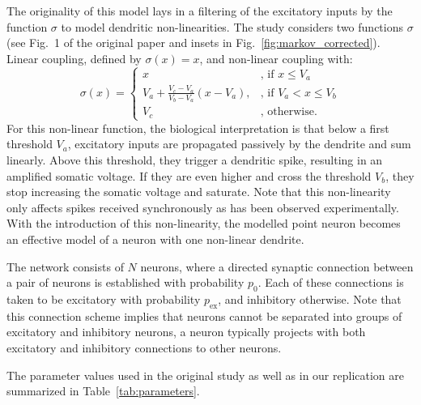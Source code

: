 \documentclass[10pt,a4paper,onecolumn]{article}
\begin{document}
The originality of this model lays in a filtering of the excitatory inputs by the function $\sigma$ to model dendritic non-linearities. The study considers two functions $\sigma$ (see Fig.~1 of the original paper and insets in Fig.~\ref{fig:markov_corrected}). Linear coupling, defined by $\sigma(x)=x$, and non-linear coupling with:
\begin{equation}
    \sigma(x)= 
\begin{cases}
    x              & \text{, if } x\leq V_a\\
    V_a + \frac{V_c-V_a}{V_b-V_a} (x - V_a), & \text{, if } V_a<x \leq V_b\\
    V_c            & \text{, otherwise.}
\end{cases}
\label{eq:non-linear}
\end{equation}
For this non-linear function, the biological interpretation is that below a first threshold $V_a$, excitatory inputs are propagated passively by the dendrite and sum linearly. Above this threshold, they trigger a dendritic spike, resulting in an amplified somatic voltage. If they are even higher and cross the threshold $V_b$, they stop increasing the somatic voltage and saturate. Note that this non-linearity only affects spikes received synchronously as has been observed experimentally. With the introduction of this non-linearity, the modelled point neuron becomes an effective model of a neuron with one non-linear dendrite.

The network consists of $N$ neurons, where a directed synaptic connection between a pair of neurons is established with probability $p_0$. Each of these connections is taken to be excitatory with probability $p_\text{ex}$, and inhibitory otherwise. Note that this connection scheme implies that neurons cannot be separated into groups of excitatory and inhibitory neurons, a neuron typically projects with both excitatory and inhibitory connections to other neurons.

The parameter values used in the original study as well as in our replication are summarized in Table~\ref{tab:parameters}.
\end{document}

